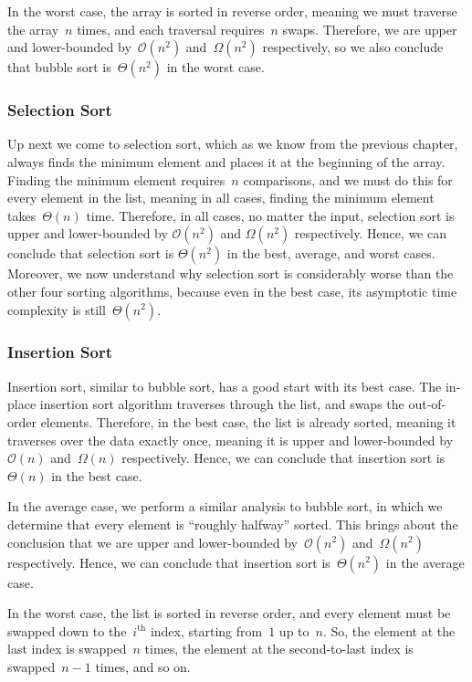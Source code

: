 In the worst case, the array is sorted in reverse order, meaning we must traverse the array~$n$ times, and each traversal requires~$n$ swaps. 
Therefore, we are upper and lower-bounded by~$\mathcal{O}(n^2)$ and~$\Omega(n^2)$ respectively, so we also conclude that bubble sort is~$\Theta(n^2)$ in the worst case.

\subsubsection*{Selection Sort}
Up next we come to selection sort, which as we know from the previous chapter, always finds the minimum element and places it at the beginning of the array. 
Finding the minimum element requires~$n$ comparisons, and we must do this for every element in the list, meaning in all cases, finding the minimum element takes~$\Theta(n)$ time. 
Therefore, in all cases, no matter the input, selection sort is upper and lower-bounded by $\mathcal{O}(n^2)$ and $\Omega(n^2)$ respectively. 
Hence, we can conclude that selection sort is $\Theta(n^2)$ in the best, average, and worst cases.
Moreover, we now understand why selection sort is considerably worse than the other four sorting algorithms, because even in the best case, its asymptotic time complexity is still~$\Theta(n^2)$.

\subsubsection*{Insertion Sort}
Insertion sort, similar to bubble sort, has a good start with its best case. 
The in-place insertion sort algorithm traverses through the list, and swaps the out-of-order elements. 
Therefore, in the best case, the list is already sorted, meaning it traverses over the data exactly once, meaning it is upper and lower-bounded by~$\mathcal{O}(n)$ and~$\Omega(n)$ respectively. 
Hence, we can conclude that insertion sort is~$\Theta(n)$ in the best case.

In the average case, we perform a similar analysis to bubble sort, in which we determine that every element is ``roughly halfway'' sorted. 
This brings about the conclusion that we are upper and lower-bounded by~$\mathcal{O}(n^2)$ and~$\Omega(n^2)$ respectively. 
Hence, we can conclude that insertion sort is~$\Theta(n^2)$ in the average case.

In the worst case, the list is sorted in reverse order, and every element must be swapped down to the~$i^\text{th}$ index, starting from~$1$ up to~$n$. So, the element at the last index is swapped~$n$ times, the element at the second-to-last index is swapped~$n - 1$ times, and so on. 

